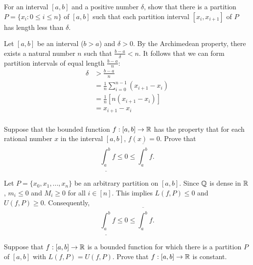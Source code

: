 \documentclass[letterpaper, twoside, 12pt]{book}
\begin{document}
\begin{exercise}[2]
  For an interval \([a,b]\) and a positive number \(\delta\),
  show that there is a partition \(P=\{x_i:0\leq i\leq n\}\) of
  \([a,b]\) such that each partition interval \([x_i,x_{i+1}]\)
  of \(P\) has length less than \(\delta\).
\end{exercise}

\begin{solution}
    Let \([a,b]\) be an interval (\(b > a\)) and \(\delta > 0\).
    By the Archimedean property, there exists a natural number
    \(n\) such that \(\frac{b - a}{\delta} < n\). It follows that
    we can form partition intervals of equal length \(\frac{b - a}{n}\):
    \begin{align*}
        \delta &> \frac{b - a}{n} \\
               &= \frac{1}{n} \sum_{i=0}^{n - 1} (x_{i + 1} - x_{i}) \\
               &= \frac{1}{n}[ n (x_{i + 1} - x_{i}) ] \\
               &= x_{i + 1} - x_{i} \\
    \end{align*}
\end{solution}


\begin{exercise}[3]
  Suppose that the bounded function \(f:[a,b]\to\mathbb R\) has the property
  that for each rational number \(x\) in the interval \([a,b]\),
  \(f(x)=0\). Prove that
  \[
    \underline{\int_a^b}f
      \leq
    0
      \leq
    \overline{\int_a^b}f
  .\]
\end{exercise}

\begin{solution}
    Let \(P = \{x_{0}, x_{1}, ... , x_{n}\}\) be an arbitrary partition on \([a,b]\).
    Since \(\mathbb Q\) is dense in \(\mathbb R\), \(m_{i} \leq 0\) and \(M_{i} \geq 0\) for
    all \(i \in [n]\). This implies \(L(f, P) \leq 0\) and \(U(f, P) \geq 0\). 
    Consequently, 
    \[ \underline{\int_a^b} f \leq 0 \leq \overline{\int_a^b} f .\]
\end{solution}


\begin{exercise}[6]
  Suppose that \(f:[a,b]\to\mathbb R\) is a bounded function for which there is
  a partition \(P\) of \([a,b]\) with \(L(f,P)=U(f,P)\). Prove that
  \(f:[a,b]\to\mathbb R\) is constant.
\end{exercise}
\end{document}

